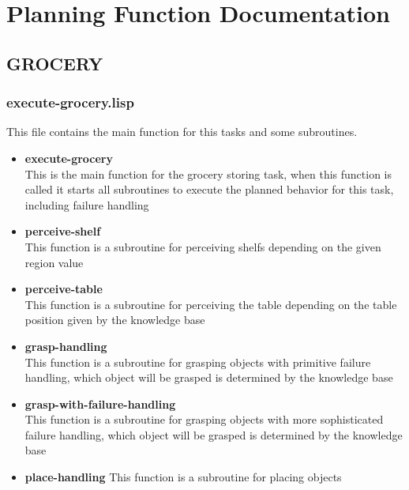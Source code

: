 \documentclass[main.tex]{subfiles}
\begin{document}
	\begingroup

	\renewcommand{\cleardoublepage}{}

	\renewcommand{\clearpage}{}

	\chapter{Planning Function Documentation}

		
		\section{GROCERY}
		
		\subsection{execute-grocery.lisp}
		This file contains the main function for this tasks and some subroutines.
		\begin{itemize}
			\item \textbf{execute-grocery} \\
			This is the main function for the grocery storing task, when this function is called it starts all subroutines to execute the planned behavior for this task, including failure handling
			\item \textbf{perceive-shelf} \\
			This function is a subroutine for perceiving shelfs depending on the given region value
			\item \textbf{perceive-table} \\
			This function is a subroutine for perceiving the table depending on the table position given by the knowledge base
			\item \textbf{grasp-handling} \\
			This function is a subroutine for grasping objects with primitive failure handling, which object will be grasped is determined by the knowledge base
			\item \textbf{grasp-with-failure-handling} \\
			This function is a subroutine for grasping objects with more sophisticated failure handling, which object will be grasped is determined by the knowledge base
			\item \textbf{place-handling}
			This function is a subroutine for placing objects
		\end{itemize}
		
\end{document}
